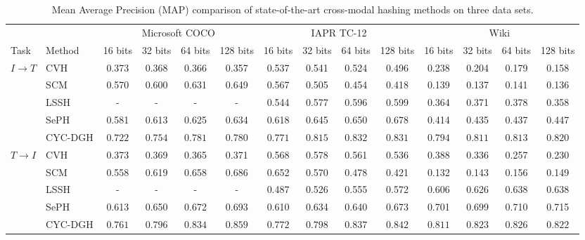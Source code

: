 \documentclass[10pt,journal,twocolumn]{IEEEtran}
\begin{document}
\begin{table*}[hbt]
  \centering
  \caption{Mean Average Precision (MAP) comparison of state-of-the-art cross-modal hashing methods on three data sets.}\label{tab:MAP-state-of-the-art}{
  \begin{tabular}{l|l|c|c|c|c|c|c|c|c|c|c|c|c}
  \hline
  & & \multicolumn{4}{c|}{Microsoft COCO} & \multicolumn{4}{c|}{IAPR TC-12} & \multicolumn{4}{c}{Wiki}\\
  \cline{3-14}
   Task & Method & 16 bits & 32 bits & 64 bits & 128 bits & 16 bits & 32 bits & 64 bits & 128 bits & 16 bits & 32 bits & 64 bits & 128 bits \\
  \hline
   \multirow{5}{*}{$I \rightarrow T$}& CVH \cite{CVH} & 0.373 & 0.368 & 0.366 & 0.357 & 0.537 & 0.541 & 0.524 & 0.496 & 0.238 & 0.204 & 0.179 & 0.158 \\
   & SCM \cite{SCM} & 0.570 & 0.600 & 0.631 & 0.649 & 0.567 & 0.505 & 0.454 & 0.418 & 0.139 & 0.137 & 0.141 & 0.136 \\
   & LSSH \cite{LSSH} & - & - & - & - & 0.544 & 0.577 & 0.596 & 0.599 & 0.364 & 0.371 & 0.378 & 0.358\\
   & SePH \cite{Semantics-hash} & 0.581 & 0.613 & 0.625 & 0.634 & 0.618 & 0.645 & 0.650 & 0.678 & 0.414 & 0.435 & 0.437 & 0.447\\
   & CYC-DGH & \color{red}$\mathbf{0.722}$ & \color{red}$\mathbf{0.754}$ & \color{red}$\mathbf{0.781}$ & \color{red}$\mathbf{0.780}$ & \color{red}$\mathbf{0.771}$ & \color{red}$\mathbf{0.815}$ & \color{red}$\mathbf{0.832}$ & \color{red}$\mathbf{0.831}$ & \color{red}$\mathbf{0.794}$ & \color{red}$\mathbf{0.811}$ & \color{red}$\mathbf{0.813}$ & \color{red}$\mathbf{0.820}$ \\
  \hline
   \multirow{5}{*}{$T \rightarrow I$} & CVH \cite{CVH} & 0.373 & 0.369 & 0.365 & 0.371 & 0.568 & 0.578 & 0.561 & 0.536 & 0.388 & 0.336 & 0.257 & 0.230\\
   & SCM \cite{SCM} & 0.558 & 0.619 & 0.658 & 0.686 & 0.652 & 0.570 & 0.478 & 0.421 & 0.132 & 0.143 & 0.156 & 0.149\\
   & LSSH \cite{LSSH} & - & - & - & - & 0.487 & 0.526 & 0.555 & 0.572 & 0.606 & 0.626 & 0.638 & 0.638 \\
   & SePH \cite{Semantics-hash} & 0.613 & 0.650 & 0.672 & 0.693 & 0.610 & 0.634 & 0.640 & 0.673 & 0.701 & 0.699 & 0.710 & 0.715\\
   & CYC-DGH & \color{red}$\mathbf{0.761}$ & \color{red}$\mathbf{0.796}$ & \color{red}$\mathbf{0.834}$ & \color{red}$\mathbf{0.859}$ & \color{red}$\mathbf{0.772}$ & \color{red}$\mathbf{0.798}$ & \color{red}$\mathbf{0.837}$ & \color{red}$\mathbf{0.842}$ & \color{red}$\mathbf{0.811}$ & \color{red}$\mathbf{0.823}$ & \color{red}$\mathbf{0.826}$ & \color{red}$\mathbf{0.822}$ \\
  \hline
  \end{tabular}
  }
\end{table*}
\end{document}
